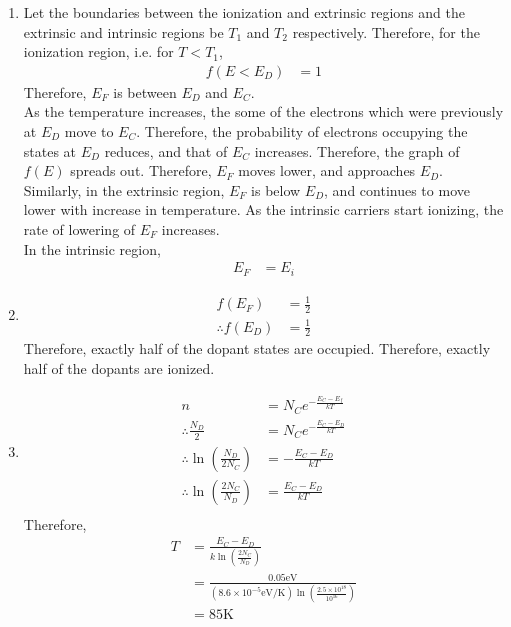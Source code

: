 \documentclass[titlepage, fleqn, a4paper, 12pt, twoside]{article}
\theoremstyle{definition}
\theoremstyle{theorem}
\begin{document}
\begin{solution}
	\begin{enumerate}[leftmargin=*]
		\item
			Let the boundaries between the ionization and extrinsic regions and the extrinsic and intrinsic regions be $T_1$ and $T_2$ respectively.
			Therefore, for the ionization region, i.e. for $T < T_1$,
			\begin{align*}
				f(E < E_D) & = 1
			\end{align*}
			Therefore, $E_F$ is between $E_D$ and $E_C$.\\
			As the temperature increases, the some of the electrons which were previously at $E_D$ move to $E_C$.
			Therefore, the probability of electrons occupying the states at $E_D$ reduces, and that of $E_C$ increases.
			Therefore, the graph of $f(E)$ spreads out.
			Therefore, $E_F$ moves lower, and approaches $E_D$.\\
			Similarly, in the extrinsic region, $E_F$ is below $E_D$, and continues to move lower with increase in temperature.
			As the intrinsic carriers start ionizing, the rate of lowering of $E_F$ increases.\\
			In the intrinsic region,
			\begin{align*}
				E_F & = E_i
			\end{align*}
		\item
			\begin{align*}
				f(E_F)            & = \frac{1}{2} \\
				\therefore f(E_D) & = \frac{1}{2}
			\end{align*}
			Therefore, exactly half of the dopant states are occupied.
			Therefore, exactly half of the dopants are ionized.
		\item
			\begin{align*}
				n                                              & = N_C e^{-\frac{E_C - E_f}{k T}} \\
				\therefore \frac{N_D}{2}                       & = N_C e^{-\frac{E_C - E_D}{k T}} \\
				\therefore \ln\left( \frac{N_D}{2 N_C} \right) & = -\frac{E_C - E_D}{k T}         \\
				\therefore \ln\left( \frac{2 N_C}{N_D} \right) & = \frac{E_C - E_D}{k T}          \\
			\end{align*}
			Therefore,
			\begin{align*}
				T & = \frac{E_C - E_D}{k \ln\left( \frac{2 N_C}{N_D} \right)}                                                                                              \\
                                  & = \frac{0.05 \si{\electronvolt}}{\left( 8.6 \times 10^{-5} \si{\electronvolt\per\kelvin} \right) \ln\left( \frac{2.5 \times 10^{18}}{10^{16}} \right)} \\
                                  & = 85 \si{\kelvin}
			\end{align*}
	\end{enumerate}
\end{solution}
\end{document}
